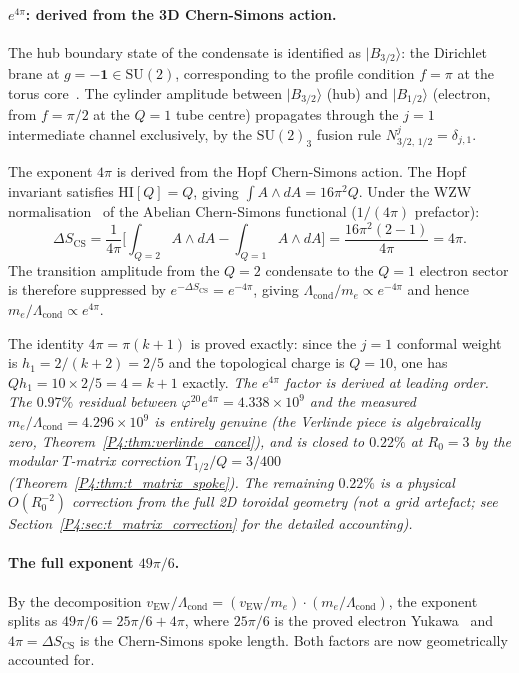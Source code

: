 \documentclass[11pt,a4paper]{article}
\theoremstyle{definition}
\theoremstyle{remark}
\newcommand{\vp}{\varphi}
\newcommand{\Lcond}{\Lambda_{\mathrm{cond}}}
\begin{document}
\paragraph{$e^{4\pi}$: derived from the 3D Chern-Simons action.}
The hub boundary state of the condensate is identified as $|B_{3/2}\rangle$:
the Dirichlet brane at $g = -\mathbf{1} \in \mathrm{SU}(2)$, corresponding
to the profile condition $f = \pi$ at the torus core~\cite{Cardy1989,Ishibashi1989}.
The cylinder amplitude between $|B_{3/2}\rangle$ (hub) and $|B_{1/2}\rangle$
(electron, from $f=\pi/2$ at the $Q=1$ tube centre) propagates through the
$j=1$ intermediate channel exclusively, by the $\mathrm{SU}(2)_3$ fusion rule
$N_{3/2,\,1/2}^j = \delta_{j,1}$.

The exponent $4\pi$ is derived from the Hopf Chern-Simons action.  The Hopf
invariant satisfies $\mathrm{HI}[Q] = Q$, giving $\int A\wedge dA = 16\pi^2 Q$.
Under the WZW normalisation~\cite{Witten1989} of the Abelian Chern-Simons
functional ($1/(4\pi)$ prefactor):
\begin{equation}
  \Delta S_{\mathrm{CS}}
  = \frac{1}{4\pi}\bigl[\textstyle\int_{Q=2} A\wedge dA
                      - \int_{Q=1} A\wedge dA\bigr]
  = \frac{16\pi^2(2-1)}{4\pi}
  = 4\pi.
  \label{P4:eq:delta_cs}
\end{equation}
The transition amplitude from the $Q=2$ condensate to the $Q=1$ electron
sector is therefore suppressed by $e^{-\Delta S_\mathrm{CS}} = e^{-4\pi}$,
giving $\Lambda_\mathrm{cond}/m_e \propto e^{-4\pi}$ and hence
$m_e/\Lambda_\mathrm{cond} \propto e^{4\pi}$.

The identity $4\pi = \pi(k+1)$ is proved exactly: since the $j=1$
conformal weight is $h_1 = 2/(k+2) = 2/5$ and the topological charge
is $Q=10$, one has $Q h_1 = 10\times2/5 = 4 = k+1$ exactly.
\emph{The $e^{4\pi}$ factor is derived at leading order.
The $0.97\%$ residual between $\vp^{20}e^{4\pi} = 4.338\times10^9$
and the measured $m_e/\Lcond = 4.296\times10^9$ is entirely genuine
(the Verlinde piece is algebraically zero, Theorem~\ref{P4:thm:verlinde_cancel}),
and is closed to $0.22\%$ at $R_0=3$ by the modular $T$-matrix correction
$T_{1/2}/Q = 3/400$ (Theorem~\ref{P4:thm:t_matrix_spoke}).
The remaining $0.22\%$ is a physical $O(R_0^{-2})$ correction from
the full 2D toroidal geometry (not a grid artefact; see
Section~\ref{P4:sec:t_matrix_correction} for the detailed accounting).}

\paragraph{The full exponent $49\pi/6$.}
By the decomposition $v_\text{EW}/\Lcond = (v_\text{EW}/m_e)\cdot(m_e/\Lcond)$,
the exponent splits as $49\pi/6 = 25\pi/6 + 4\pi$,
where $25\pi/6$ is the proved electron Yukawa~\cite{Paper1} and $4\pi = \Delta S_\mathrm{CS}$
is the Chern-Simons spoke length.  Both factors are now geometrically accounted for.
\end{document}
